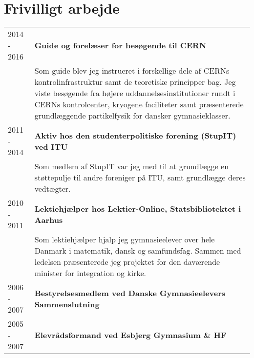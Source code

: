 \documentclass[12pt,a4paper,notitlepage]{article}
\begin{document}
\section*{Frivilligt arbejde}
\begin{tabularx}{\textwidth}{l X}
2014 - 2016 & \textbf{Guide og forelæser for besøgende til CERN} \\
            & Som guide blev jeg instrueret i forskellige dele af CERNs
              kontrolinfrastruktur samt de teoretiske principper bag. Jeg
              viste besøgende fra højere uddannelsesinstitutioner rundt i CERNs
              kontrolcenter, kryogene faciliteter samt præsenterede
              grundlæggende partikelfysik for dansker gymnasieklasser. \\
2011 - 2014 & \textbf{Aktiv hos den studenterpolitiske forening (StupIT) ved ITU} \\
            & Som medlem af StupIT var jeg med til at grundlægge en støttepulje
              til andre foreniger på ITU, samt grundlægge deres vedtægter. \\
2010 - 2011 & \textbf{Lektiehjælper hos Lektier-Online, Statsbibliotektet i Aarhus} \\
            & Som lektiehjælper hjalp jeg gymnasieelever over hele Danmark i
              matematik, dansk og samfundsfag. Sammen med ledelsen præsenterede
              jeg projektet for den daværende minister for integration og kirke. \\
2006 - 2007 & \textbf{Bestyrelsesmedlem ved Danske Gymnasieelevers Sammenslutning} \\
2005 - 2007 & \textbf{Elevrådsformand ved Esbjerg Gymnasium \& HF} \\
\end{tabularx}
\end{document}
